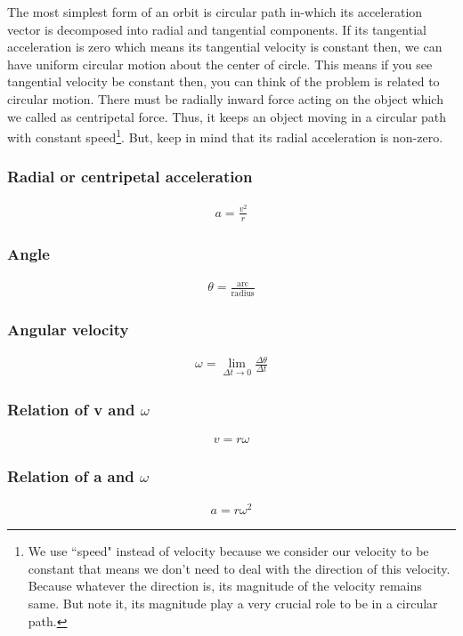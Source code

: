 The most simplest form of an orbit is circular path in-which its acceleration vector is decomposed into radial and tangential components. If its tangential acceleration is zero which means its tangential velocity is constant then, we can have uniform circular motion about the center of circle.  This means if you see tangential velocity be constant then, you can think of the problem is related to circular motion. There must be radially inward force acting on the object which we called as centripetal force. Thus, it keeps an object moving in a circular path with constant speed\footnote{We use ``speed" instead of velocity because we consider our velocity to be constant that means we don't need to deal with the direction of this velocity. Because whatever the direction is, its magnitude of the velocity remains same. But note it, its magnitude play a very crucial role to be in a circular path.}. But, keep in mind that its radial acceleration is non-zero.

\subsubsection*{Radial or centripetal acceleration}
\begin{align*}
a = \frac{v^{2}}{r}
\end{align*}

\subsubsection*{Angle}
\begin{align*}
\theta = \frac{\text{arc}}{\text{radius}}
\end{align*}

\subsubsection*{Angular velocity}
\begin{align*}
\omega = \lim_{\Delta t \to 0}\frac{\Delta \theta}{\Delta t}
\end{align*}

\subsubsection*{Relation of v and $\omega$}
\begin{align}
v = r\omega
\end{align}

\subsubsection*{Relation of a and $\omega$}
\begin{align}
a = r\omega^{2}
\end{align}

